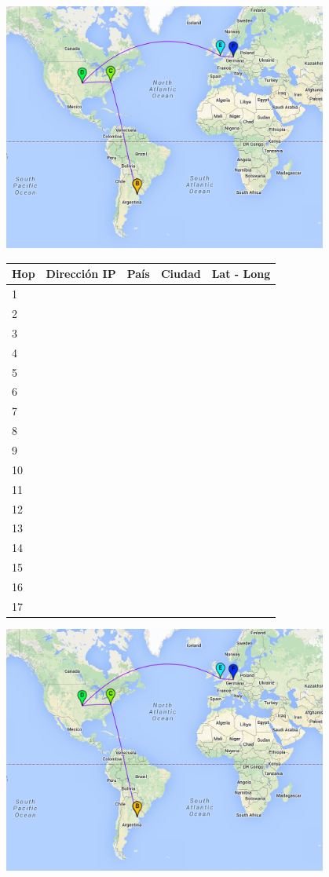 \centerline{\includegraphics[width=0.8\textwidth]{mapas/Alemania.jpeg}}

\begin{center}
 \begin{tabular}{|l|l|l|l|l|}
    \hline
    Hop &Dirección IP &País &Ciudad &Lat - Long \\ \hline \hline
    1 &  & & & \\ \hline
    2 &  & & & \\ \hline
    3 &  & & & \\ \hline
    4 &  & & & \\ \hline
    5 &  & & & \\ \hline
    6 &  & & & \\ \hline
    7 &  & & & \\ \hline
    8 &  & & & \\ \hline
    9 &  & & & \\ \hline
    10 & & & & \\ \hline
    11 & & & & \\ \hline
    12 & & & & \\ \hline
    13 & & & & \\ \hline
    14 & & & & \\ \hline
    15 & & & & \\ \hline
    16 & & & & \\ \hline
    17 & & & & \\ \hline
 \end{tabular}
\end{center}

\centerline{\includegraphics[width=0.8\textwidth]{mapas/Alemania.jpeg}}

